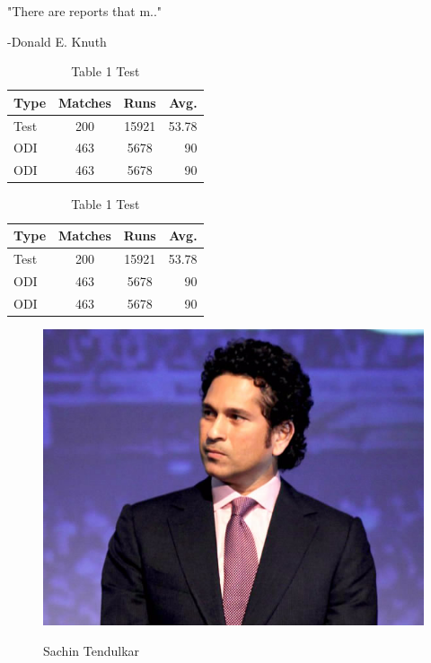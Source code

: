 \documentclass{report}
\begin{document}
"There are reports that m.."

\hfill{-Donald E. Knuth}

\begin{table}[H]
	\centering
\begin{tabular}{|l|c|c|r|}
	\hline
	\textbf{Type}&\textbf{Matches}&\textbf{Runs}&\textbf{Avg.}\\
	\hline \hline
	Test&200&15921&53.78\\
	\hline 
	ODI&463&5678&90 \\
	\hline
	ODI&463&5678&90 \\	
	\hline
\end{tabular}
\caption{Table 1 Test}
\label{cs}
\end{table}


\begin{table}[H]
	\centering
	\begin{tabular}{|l|c|c|r|}
		\hline
		\textbf{Type}&\textbf{Matches}&\textbf{Runs}&\textbf{Avg.}\\
		\hline \hline
		Test&200&15921&53.78\\
		\hline 
		ODI&463&5678&90 \\
		\hline
		ODI&463&5678&90 \\	
		\hline
	\end{tabular}
	\caption{Table 1 Test}
\end{table}

\begin{figure}
	\centering
	\includegraphics[scale=0.5]{Sachin-01}
	\label{sachinface}
	\caption{Sachin Tendulkar}

\end{figure}
\end{document}
